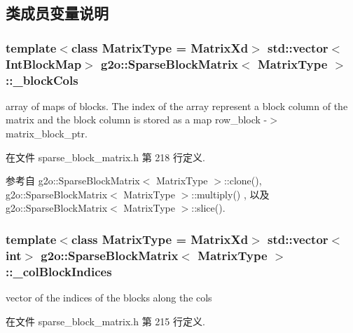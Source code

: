 \subsection{类成员变量说明}
\hypertarget{classg2o_1_1SparseBlockMatrix_ae236d56a01ba4d292450a518621b41f8}{
\subsubsection[{\-\_\-block\-Cols}]{\setlength{\rightskip}{0pt plus 5cm}template$<$class Matrix\-Type = Matrix\-Xd$>$ std\-::vector$<$Int\-Block\-Map$>$ {\bf g2o\-::\-Sparse\-Block\-Matrix}$<$ Matrix\-Type $>$\-::\-\_\-block\-Cols\hspace{0.3cm}{\ttfamily [protected]}}}\label{classg2o_1_1SparseBlockMatrix_ae236d56a01ba4d292450a518621b41f8}
array of maps of blocks. The index of the array represent a block column of the matrix and the block column is stored as a map row\-\_\-block -\/$>$ matrix\-\_\-block\-\_\-ptr. 

在文件 sparse\-\_\-block\-\_\-matrix.\-h 第 218 行定义.



参考自 g2o\-::\-Sparse\-Block\-Matrix$<$ Matrix\-Type $>$\-::clone(), g2o\-::\-Sparse\-Block\-Matrix$<$ Matrix\-Type $>$\-::multiply() , 以及 g2o\-::\-Sparse\-Block\-Matrix$<$ Matrix\-Type $>$\-::slice().

\hypertarget{classg2o_1_1SparseBlockMatrix_aca008740c37d2d00b90f696ab19abb59}{
\subsubsection[{\-\_\-col\-Block\-Indices}]{\setlength{\rightskip}{0pt plus 5cm}template$<$class Matrix\-Type = Matrix\-Xd$>$ std\-::vector$<$int$>$ {\bf g2o\-::\-Sparse\-Block\-Matrix}$<$ Matrix\-Type $>$\-::\-\_\-col\-Block\-Indices\hspace{0.3cm}{\ttfamily [protected]}}}\label{classg2o_1_1SparseBlockMatrix_aca008740c37d2d00b90f696ab19abb59}
vector of the indices of the blocks along the cols 

在文件 sparse\-\_\-block\-\_\-matrix.\-h 第 215 行定义.



